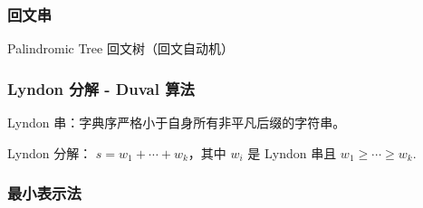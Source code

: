 \subsubsection{回文串}


\noindent Palindromic Tree 回文树（回文自动机）


\subsubsection{Lyndon 分解 - Duval 算法}

Lyndon 串：字典序严格小于自身所有非平凡后缀的字符串。

Lyndon 分解： $s = w_1 + \cdots + w_k$，其中 $w_i$ 是 Lyndon 串且 $w_1 \geqslant \cdots \geqslant w_k$.


\subsubsection{最小表示法}

